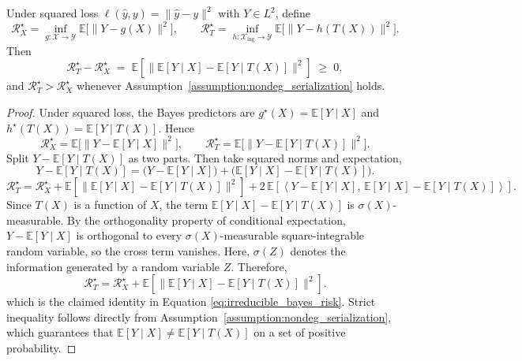 \begin{lemma}
\label{lem:bayes_gap}
Under squared loss $\ell(\hat y,y)=\|\hat y-y\|^2$ with $Y\in L^2$, define
\begin{equation}
\mathcal{R}_X^\star=\inf_{g:\mathcal{X}\to\mathcal{Y}}\mathbb{E}\big[\|Y-g(X)\|^2\big],
\qquad
\mathcal{R}_T^\star=\inf_{h:\mathcal{X}_{\mathrm{lng}}\to\mathcal{Y}}\mathbb{E}\big[\|Y-h(T(X))\|^2\big].
\end{equation}
Then
\begin{equation}
\label{eq:irreducible_bayes_risk}
\mathcal{R}_T^\star - \mathcal{R}_X^\star
\;=\;
\mathbb{E}\!\left[\big\|\mathbb{E}[Y\mid X]-\mathbb{E}[Y\mid T(X)]\big\|^2\right]
\;\ge\; 0,
\end{equation}
and $\mathcal{R}_T^\star > \mathcal{R}_X^\star$ whenever Assumption~\ref{assumption:nondeg_serialization} holds.
\end{lemma}
\begin{proof}
Under squared loss, the Bayes predictors are $g^\star(X)=\mathbb{E}[Y\mid X]$ and $h^\star(T(X))=\mathbb{E}[Y\mid T(X)]$. Hence
\begin{equation}
\mathcal{R}_X^\star
=
\mathbb{E}\big[\|Y-\mathbb{E}[Y\mid X]\|^2\big],
\qquad
\mathcal{R}_T^\star
=
\mathbb{E}\big[\|Y-\mathbb{E}[Y\mid T(X)]\|^2\big].
\end{equation}
Split $Y-\mathbb{E}[Y\mid T(X)]$ as two parts. Then take squared norms and expectation,
\begin{equation}
Y-\mathbb{E}[Y\mid T(X)]
=
\big(Y-\mathbb{E}[Y\mid X]\big)
+
\big(\mathbb{E}[Y\mid X]-\mathbb{E}[Y\mid T(X)]\big).
\end{equation}
\begin{equation}
\mathcal{R}_T^\star=
\mathcal{R}_X^\star
+
\mathbb{E}\!\left[\big\|\mathbb{E}[Y\mid X]-\mathbb{E}[Y\mid T(X)]\big\|^2\right] 
+2\,\mathbb{E}\!\left[
\left\langle
Y-\mathbb{E}[Y\mid X],\,
\mathbb{E}[Y\mid X]-\mathbb{E}[Y\mid T(X)]
\right\rangle
\right].
\end{equation}
Since $T(X)$ is a function of $X$, the term $\mathbb{E}[Y\mid X]-\mathbb{E}[Y\mid T(X)]$ is $\sigma(X)$-measurable. By the orthogonality property of conditional expectation, $Y-\mathbb{E}[Y\mid X]$ is orthogonal to every $\sigma(X)$-measurable square-integrable random variable, so the cross term vanishes. Here, $\sigma(Z)$ denotes the information generated by a random variable $Z$. Therefore,
\begin{equation}
\mathcal{R}_T^\star
=
\mathcal{R}_X^\star
+
\mathbb{E}\!\left[\big\|\mathbb{E}[Y\mid X]-\mathbb{E}[Y\mid T(X)]\big\|^2\right].
\end{equation}
which is the claimed identity in Equation \ref{eq:irreducible_bayes_risk}. Strict inequality follows directly from Assumption~\ref{assumption:nondeg_serialization}, which guarantees that $\mathbb{E}[Y\mid X]\neq\mathbb{E}[Y\mid T(X)]$ on a set of positive probability.
\end{proof}

